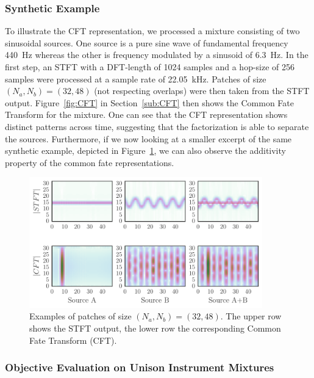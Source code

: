\subsubsection{Synthetic Example}
\label{sub:Synthentic_Examples}

To illustrate the CFT representation, we processed a mixture consisting of two sinusoidal sources. One source is a pure sine wave of fundamental frequency 440~Hz whereas the other is frequency modulated by a sinusoid of 6.3~Hz. In the first step, an STFT with a DFT-length of 1024 samples and a hop-size of 256 samples were processed at a sample rate of 22.05~kHz. Patches of size $(N_a, N_b) = (32, 48)$ (not respecting overlaps) were then taken from the STFT output. Figure~\ref{fig:CFT} in Section~\ref{sub:CFT} then shows the Common Fate Transform for the mixture. One can see that the CFT representation shows distinct patterns across time, suggesting that the factorization is able to separate the sources. 
Furthermore, if we now looking at a smaller excerpt of the same synthetic example, depicted in Figure~\ref{fig:gridplot}, we can also observe the additivity property of the common fate representations.

\begin{figure}[!h]
\centering
        \includegraphics[width=0.9\textwidth]{Chapters/06_Separation_Unknown/figures/gridplot.pdf}
\caption{Examples of patches of size $(N_a, N_b) = (32, 48)$. The upper row shows the STFT output, the lower row the corresponding Common Fate Transform (CFT).}
\label{fig:gridplot}
\end{figure}

\subsubsection{Objective Evaluation on Unison Instrument Mixtures}

